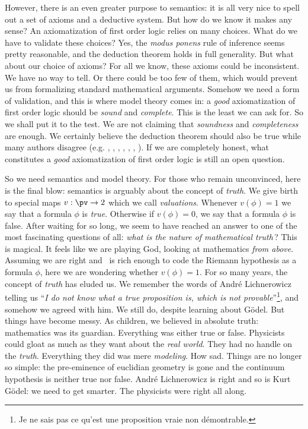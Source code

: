 However, there is an even greater purpose to semantics: it is all
very nice to spell out a set of axioms and a deductive system. But
how do we know it makes any sense? An axiomatization of first order
logic relies on many choices. What do we have to validate these
choices? Yes, the {\em modus ponens} rule of inference seems pretty
reasonable, and the deduction theorem holds in full generality. But
what about our choice of axioms? For all we know, these axioms could
be inconsistent. We have no way to tell. Or there could be too few
of them, which would prevent us from formalizing standard
mathematical arguments. Somehow we need a form of validation, and
this is where model theory comes in: a {\em good} axiomatization of
first order logic should be {\em sound} and {\em complete}. This is
the least we can ask for. So we shall put it to the test. We are not
claiming that {\em soundness} and {\em completeness} are enough. We
certainly believe the deduction theorem should also be true while
many authors disagree (e.g. \cite{Ferenczi}, \cite{Hoyois},
\cite{Johnstone}, \cite{Kunen}, \cite{Monk}, \cite{Metamath},
\cite{Tourlakis}). If we are completely honest, what constitutes a
{\em good} axiomatization of first order logic is still an open
question.

So we need semantics and model theory. For those who remain
unconvinced, here is the final blow: semantics is arguably about the
concept of {\em truth}. We give birth to special maps $v:\pv\to 2$
which we call {\em valuations}. Whenever $v(\phi)=1$ we say that a
formula $\phi$ is {\em true}. Otherwise if $v(\phi)=0$, we say that
a formula $\phi$ is false. After waiting for so long, we seem to
have reached an answer to one of the most fascinating questions of
all: {\em what is the nature of mathematical truth}\,? This is
magical. It feels like we are playing God, looking at mathematics
{\em from above}. Assuming we are right and \pv\ is rich enough to
code the Riemann hypothesis as a formula $\phi$,  here we are
wondering whether $v(\phi)=1$. For so many years, the concept of
{\em truth} has eluded us. We remember the words of Andr\'e
Lichnerowicz telling us ``{\em I do not know what a true proposition
is, which is not provable}''\footnote{Je ne sais pas ce qu'est une
proposition vraie non d\'emontrable.}, and somehow we agreed with
him. We still do, despite learning about G\"odel. But things have
become messy. As children, we believed in absolute truth:
mathematics was its guardian. Everything was either true or false.
Physicists could gloat as much as they want about the {\em real
world}. They had no handle on the {\em truth}. Everything they did
was mere {\em modeling}. How sad. Things are no longer so simple:
the pre-eminence of euclidian geometry is gone and the continuum
hypothesis is neither true nor false. Andr\'e Lichnerowicz is right
and so is Kurt G\"odel: we need to get smarter. The physicists were
right all along.
